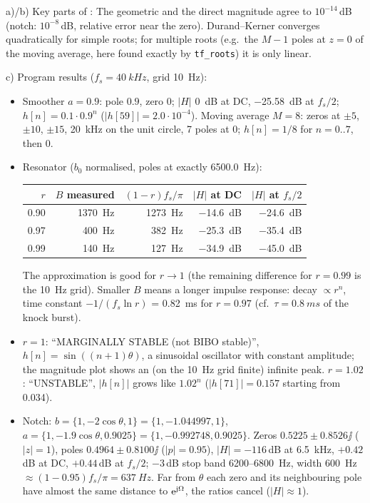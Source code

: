 \begin{solution}
a)/b) Key parts of :
The geometric and the direct magnitude agree to $10^{-14}$\,dB (notch:
$10^{-8}$\,dB, relative error near the zero). Durand--Kerner converges
quadratically for simple roots; for multiple roots (e.g.\ the $M-1$ poles at
$z=0$ of the moving average, here found exactly by \texttt{tf\_roots}) it is
only linear.

c) Program results ($f_s=\SI{40}{kHz}$, grid \SI{10}{Hz}):
\begin{itemize}
  \item Smoother $a=0.9$: pole $0.9$, zero $0$; $|H|$ \SI{0}{dB} at DC,
    \SI{-25.58}{dB} at $f_s/2$; $h[n]=0.1\cdot0.9^n$ ($|h[59]|=2.0\cdot10^{-4}$).
    Moving average $M=8$: zeros at $\pm5$, $\pm10$, $\pm15$, \SI{20}{kHz} on
    the unit circle, 7 poles at 0; $h[n]=1/8$ for $n=0..7$, then 0.
  \item Resonator ($b_0$ normalised, poles at exactly \SI{6500.0}{Hz}):
    \begin{center}\small
    \begin{tabular}{rrrrr}
    \toprule
    $r$ & $B$ measured & $(1-r)f_s/\pi$ & $|H|$ at DC & $|H|$ at $f_s/2$\\
    \midrule
    0.90 & \SI{1370}{Hz} & \SI{1273}{Hz} & \SI{-14.6}{dB} & \SI{-24.6}{dB}\\
    0.97 & \SI{400}{Hz} & \SI{382}{Hz} & \SI{-25.3}{dB} & \SI{-35.4}{dB}\\
    0.99 & \SI{140}{Hz} & \SI{127}{Hz} & \SI{-34.9}{dB} & \SI{-45.0}{dB}\\
    \bottomrule
    \end{tabular}
    \end{center}
    The approximation is good for $r\to1$ (the remaining difference for
    $r=0.99$ is the \SI{10}{Hz} grid). Smaller $B$ means a longer impulse
    response: decay $\propto r^n$, time constant $-1/(f_s\ln r)$ = \SI{0.82}{ms}
    for $r=0.97$ (cf.\ $\tau=\SI{0.8}{ms}$ of the knock burst).
  \item $r=1$: ``MARGINALLY STABLE (not BIBO stable)'', $h[n]=\sin((n+1)\theta)$,
    a sinusoidal oscillator with constant amplitude; the magnitude plot shows
    an (on the \SI{10}{Hz} grid finite) infinite peak. $r=1.02$: ``UNSTABLE'',
    $|h[n]|$ grows like $1.02^n$ ($|h[71]|=0.157$ starting from 0.034).
  \item Notch: $b=\{1,-2\cos\theta,1\}=\{1,-1.044997,1\}$,
    $a=\{1,-1.9\cos\theta,0.9025\}=\{1,-0.992748,0.9025\}$. Zeros
    $0.5225\pm0.8526\jj$ ($|z|=1$), poles $0.4964\pm0.8100\jj$ ($|p|=0.95$),
    $|H|=-116$\,dB at \SI{6.5}{kHz}, $+0.42$\,dB at DC, $+0.44$\,dB at $f_s/2$;
    $-3$\,dB stop band \SI{6200}{}--\SI{6800}{Hz}, width \SI{600}{Hz}
    $\approx(1-0.95)f_s/\pi=\SI{637}{Hz}$. Far from $\theta$ each zero and
    its neighbouring pole have almost the same distance to $\mathrm{e}^{\mathrm{j}\Omega}$,
    the ratios cancel ($|H|\approx1$).
\end{itemize}


\end{solution}
